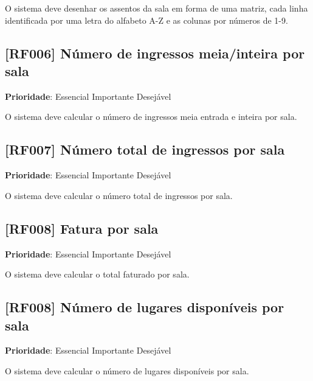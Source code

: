 \documentclass[12pt,a4paper]{article}
\begin{document}
O sistema deve desenhar os assentos da sala em forma de uma matriz, cada
linha identificada por uma letra do alfabeto A-Z e as colunas por números de
1-9.

\subsection{[RF006] Número de ingressos meia/inteira por sala}

\textbf{Prioridade}:
\mbox{\ooalign{$\checkmark$\cr\hidewidth$\square$\hidewidth\cr}} Essencial
\mbox{\ooalign{\cr\hidewidth$\square$\hidewidth\cr}} Importante
\mbox{\ooalign{\cr\hidewidth$\square$\hidewidth\cr}} Desejável

O sistema deve calcular o número de ingressos meia entrada e inteira por sala.

\subsection{[RF007] Número total de ingressos por sala}

\textbf{Prioridade}:
\mbox{\ooalign{$\checkmark$\cr\hidewidth$\square$\hidewidth\cr}} Essencial
\mbox{\ooalign{\cr\hidewidth$\square$\hidewidth\cr}} Importante
\mbox{\ooalign{\cr\hidewidth$\square$\hidewidth\cr}} Desejável

O sistema deve calcular o número total de ingressos por sala.

\subsection{[RF008] Fatura por sala}

\textbf{Prioridade}:
\mbox{\ooalign{$\checkmark$\cr\hidewidth$\square$\hidewidth\cr}} Essencial
\mbox{\ooalign{\cr\hidewidth$\square$\hidewidth\cr}} Importante
\mbox{\ooalign{\cr\hidewidth$\square$\hidewidth\cr}} Desejável

O sistema deve calcular o total faturado por sala.

\subsection{[RF008] Número de lugares disponíveis por sala}

\textbf{Prioridade}:
\mbox{\ooalign{$\checkmark$\cr\hidewidth$\square$\hidewidth\cr}} Essencial
\mbox{\ooalign{\cr\hidewidth$\square$\hidewidth\cr}} Importante
\mbox{\ooalign{\cr\hidewidth$\square$\hidewidth\cr}} Desejável

O sistema deve calcular o número de lugares disponíveis por sala.
\end{document}
